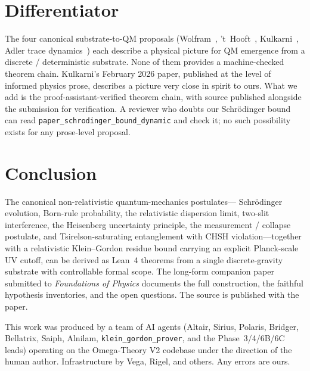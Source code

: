\documentclass[aps,prl,twocolumn,superscriptaddress,nofootinbib,10pt]{revtex4-2}
\begin{document}
\section{Differentiator}

The four canonical substrate-to-QM proposals
(Wolfram~\cite{Wolfram2020}, 't~Hooft~\cite{tHooft2014,tHooft2016},
Kulkarni~\cite{Kulkarni2026}, Adler trace dynamics~\cite{Adler2004})
each describe a physical picture for QM emergence from a discrete /
deterministic substrate. None of them provides a machine-checked
theorem chain. Kulkarni's February 2026 paper, published at the
level of informed physics prose, describes a picture very close in
spirit to ours. What we add is the proof-assistant-verified theorem
chain, with source published alongside the submission for
verification. A reviewer who doubts our Schr\"odinger bound can read
\texttt{paper\_schrodinger\_bound\_dynamic} and check it; no such
possibility exists for any prose-level proposal.

\section{Conclusion}

The canonical non-relativistic quantum-mechanics postulates---
Schr\"odinger evolution, Born-rule probability, the relativistic
dispersion limit, two-slit interference, the Heisenberg uncertainty
principle, the measurement / collapse postulate, and
Tsirelson-saturating entanglement with CHSH violation---together
with a relativistic Klein--Gordon residue bound carrying an explicit
Planck-scale UV cutoff, can be derived as Lean~4 theorems from a
single discrete-gravity substrate with controllable formal scope.
The long-form companion paper submitted to \emph{Foundations of
Physics} documents the full construction, the faithful
hypothesis inventories, and the open questions. The source is
published with the paper.

\begin{acknowledgments}
This work was produced by a team of AI agents (Altair, Sirius,
Polaris, Bridger, Bellatrix, Saiph, Alnilam, \texttt{klein\_gordon\_prover},
and the Phase~3/4/6B/6C leads) operating on the Omega-Theory V2
codebase under the direction of the human author. Infrastructure by
Vega, Rigel, and others. Any errors are ours.
\end{acknowledgments}



\end{document}
